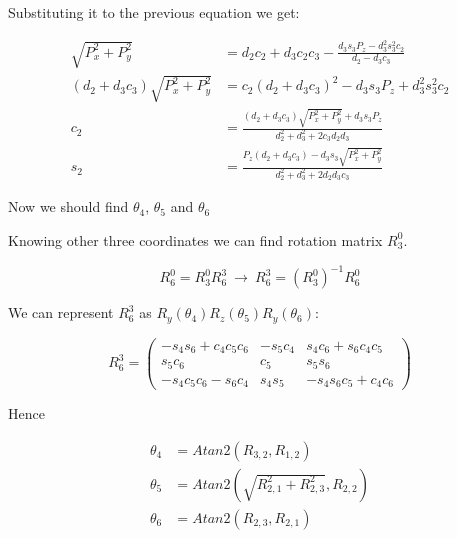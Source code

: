 Substituting it to the previous equation we get:

$$\begin{aligned}
    \sqrt{P_x^2 + P_y^2} & = d_2c_2 + d_3c_2c_3 - \frac{d_3s_3P_z - d_3^2s_3^2c_2}{d_2 - d_3c_3} \\
    (d_2 + d_3c_3)\sqrt{P_x^2 + P_y^2} & = c_2(d_2 + d_3c_3)^2 - d_3s_3P_z + d_3^2s_3^2c_2 \\
    c_2 & = \frac{(d_2 + d_3c_3)\sqrt{P_x^2 + P_y^2} + d_3 s_3P_z}{d_2^2 + d_3^2 + 2c_3d_2d_3} \\
    s_2 & = \frac{P_z(d_2 + d_3c_3) - d_3s_3\sqrt{P_x^2 + P_y^2}}{d_2^2 + d_3^2 + 2d_2d_3c_3}
\end{aligned}$$

Now we should find $\theta_4$, $\theta_5$ and $\theta_6$

Knowing other three coordinates we can find rotation matrix $R_3^0$.

$$R_6^0 = R_3^0 R_6^3\ \longrightarrow \ R_6^3 = (R_3^0)^{-1} R_6^0$$

We can represent $R_6^3$ as $R_y(\theta_4) R_z(\theta_5) R_y(\theta_6)$:

$$R_6^3 = \begin{pmatrix}
    -s_4s_6 + c_4c_5c_6 & -s_5c_4 & s_4c_6 + s_6c_4c_5 \\
    s_5c_6 & c_5 & s_5s_6 \\
    -s_4c_5c_6 - s_6c_4 & s_4s_5 & -s_4s_6c_5 + c_4c_6
\end{pmatrix}$$

Hence

$$\begin{aligned}
    \theta_4 & = Atan2(R_{3, 2}, R_{1, 2}) \\
    \theta_5 & = Atan2(\sqrt{R_{2, 1}^2 + R_{2, 3}^2}, R_{2, 2}) \\
    \theta_6 & = Atan2(R_{2, 3}, R_{2, 1})
\end{aligned}$$
